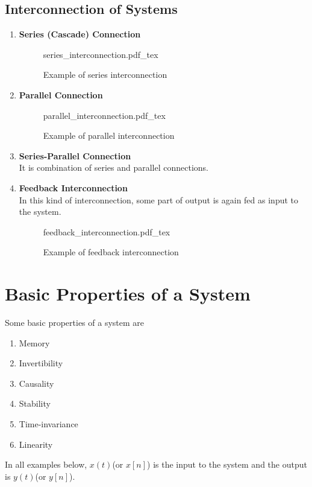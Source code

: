 \documentclass[oneside]{book}
\newcommand{\incfig}[1]{%
    {#1.pdf_tex}
}
\begin{document}
\subsection{Interconnection of Systems}
\begin{enumerate}
	\item \textbf{Series (Cascade) Connection}
	      \begin{figure}[ht]
		      \centering
		      \incfig{series_interconnection}
		      \caption{Example of series interconnection}
	      \end{figure}
	\item \textbf{Parallel Connection}
	      \begin{figure}[ht]
		      \centering
		      \incfig{parallel_interconnection}
		      \caption{Example of parallel interconnection}
	      \end{figure}
	\item \textbf{Series-Parallel Connection}\\
	      It is combination of series and parallel connections.
	\item \textbf{Feedback Interconnection}\\
	      In this kind of interconnection, some part of output is again fed as input to the system.
	      \begin{figure}[ht]
		      \centering
		      \incfig{feedback_interconnection}
		      \caption{Example of feedback interconnection}
	      \end{figure}
\end{enumerate}

\section{Basic Properties of a System}
Some basic properties of a system are
\begin{enumerate}
	\item Memory
	\item Invertibility
	\item Causality
	\item Stability
	\item Time-invariance
	\item Linearity
\end{enumerate}

In all examples below, $x(t)$(or $x[n]$) is the input to the system and the output is $y(t)$(or $y[n]$).
\end{document}
